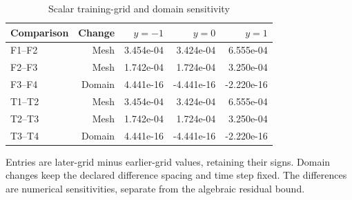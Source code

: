 \begin{table}[!htbp]
\centering\small
\caption{Scalar training-grid and domain sensitivity}
\label{tab:r15scalarrefinement}
\begin{tabular}{lrrrr}
\toprule
Comparison & Change & $y=-1$ & $y=0$ & $y=1$ \\
\midrule
F1--F2 & Mesh & 3.454e-04 & 3.424e-04 & 6.555e-04 \\
F2--F3 & Mesh & 1.742e-04 & 1.724e-04 & 3.250e-04 \\
F3--F4 & Domain & 4.441e-16 & -4.441e-16 & -2.220e-16 \\
T1--T2 & Mesh & 3.454e-04 & 3.424e-04 & 6.555e-04 \\
T2--T3 & Mesh & 1.742e-04 & 1.724e-04 & 3.250e-04 \\
T3--T4 & Domain & 4.441e-16 & -4.441e-16 & -2.220e-16 \\
\bottomrule
\end{tabular}
\par\medskip\noindent\footnotesize Entries are later-grid minus earlier-grid values, retaining their signs. Domain changes keep the declared difference spacing and time step fixed. The differences are numerical sensitivities, separate from the algebraic residual bound.
\end{table}
